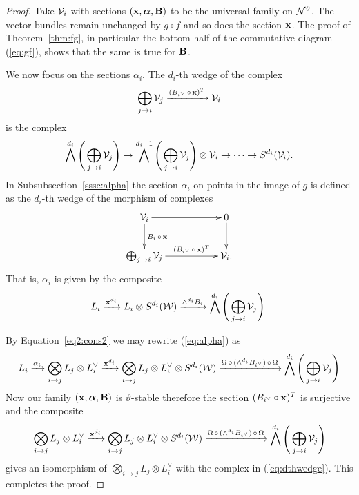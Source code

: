 \documentclass{amsart}
\newcommand{\balpha}{\boldsymbol{\alpha}}
\theoremstyle{definition}
\begin{document}
\begin{proof}
Take $\mathcal{V}_i$ with sections $(\bfx, \balpha, \bfB)$ to be the universal family on $\mathcal{N}^\vartheta$.
The vector bundles remain unchanged by $g \circ f$ and so does the section $\mathbf{x}$.
The proof of Theorem~\ref{thm:fg}, in particular the bottom half of the commutative diagram (\ref{eq:gf}), shows that the same is true for $\mathbf{B}$.

We now focus on the sections $\alpha_i$.
The $d_i$-th wedge of the complex
$$\bigoplus_{j \rightarrow i} \mathcal{V}_j \xrightarrow{(B_{i^\vee} \,\circ\, \mathbf{x})^T} \mathcal{V}_i$$
is the complex
\begin{equation}\label{eq:dthwedge}
    \bigwedge^{d_i} \Bigg(\bigoplus_{j \rightarrow i} \mathcal{V}_j \Bigg) \rightarrow \bigwedge^{d_i-1} \Bigg(\bigoplus_{j \rightarrow i} \mathcal{V}_j \Bigg) \otimes \mathcal{V}_i \rightarrow \cdots \rightarrow S^{d_i}(\mathcal{V}_i).
\end{equation}
In Subsubsection~\ref{sssc:alpha} the section $\alpha_i$ on points in the image of $g$ is defined as the $d_i$-th wedge of the morphism of complexes
\begin{equation*}
    \xymatrix{\cV_i \ar[rr] \ar[d]^{B_i \,\circ\, \bfx} && 0 \ar[d] \\
    \bigoplus_{j \rightarrow i} \cV_j \ar[rr]^-{(B_{i^\vee} \,\circ\, \bfx)^T} && \cV_i.}
\end{equation*}
That is, $\alpha_i$ is given by the composite 
\begin{equation}\label{eq:alpha}
    L_i \xrightarrow{\mathbf{x}^{d_i}} L_i \otimes S^{d_i}(\mathcal{W}) \xrightarrow{\wedge^{d_i} B_{i}} 
\bigwedge^{d_i} \Bigg(\bigoplus_{j \rightarrow i} \mathcal{V}_j \Bigg).
\end{equation}

By Equation~\ref{eq2:cons2} we may rewrite (\ref{eq:alpha}) as 
$$L_i \xrightarrow{\alpha_i} \bigotimes_{i \rightarrow j} L_j  \otimes L_i^\vee \xrightarrow{\mathbf{x}^{d_i}} \bigotimes_{i \rightarrow j} L_j \otimes L_i^\vee \otimes S^{d_i}(\mathcal{W}) \xrightarrow{\Omega \,\circ\, (\wedge^{d_i} B_{i^\vee}) \,\circ\, \Omega} 
\bigwedge^{d_i} \Bigg(\bigoplus_{j \rightarrow i} \mathcal{V}_j \Bigg)$$
Now our family $(\bfx, \balpha, \bfB)$ is $\vartheta$-stable therefore the section $(B_{i^\vee} \circ \mathbf{x})^T$ is surjective and the composite $$\bigotimes_{i \rightarrow j} L_j  \otimes L_i^\vee \xrightarrow{\mathbf{x}^{d_i}} \bigotimes_{i \rightarrow j} L_j \otimes L_i^\vee \otimes S^{d_i}(\mathcal{W}) \xrightarrow{\Omega \,\circ\, (\wedge^{d_i} B_{i^\vee}) \,\circ\, \Omega} 
\bigwedge^{d_i} \Bigg(\bigoplus_{j \rightarrow i} \mathcal{V}_j \Bigg)$$
gives an isomorphism of $\bigotimes_{i \rightarrow j} L_j  \otimes L_i^\vee$ with the complex in (\ref{eq:dthwedge}).
This completes the proof.
\end{proof}
\end{document}
